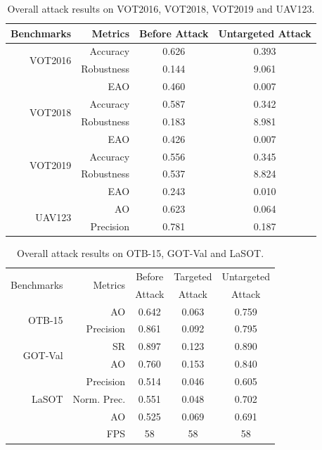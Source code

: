\documentclass[journal]{IEEEtran}
\begin{document}
\begin{table}[h]
  \centering
  \caption{Overall attack results on VOT2016, VOT2018, VOT2019 and UAV123.}
  \begin{tabular}{rrcc}
  \toprule
  Benchmarks & Metrics & Before Attack    & Untargeted Attack  \\
  \midrule
  \multirow{2}{*}[-6pt]{VOT2016} 
  & Accuracy   & 0.626 & 0.393\\
  & Robustness & 0.144 & 9.061\\
  & EAO        & 0.460 & 0.007\\
  \midrule
  \multirow{2}{*}[-6pt]{VOT2018} 
  & Accuracy   & 0.587 & 0.342\\
  & Robustness & 0.183 & 8.981\\
  & EAO        & 0.426 & 0.007\\
  \midrule
  \multirow{2}{*}[-6pt]{VOT2019} 
  & Accuracy   & 0.556 & 0.345\\
  & Robustness & 0.537 & 8.824\\
  & EAO        & 0.243 & 0.010\\
  \midrule
  \multirow{3}{*}[+6pt]{UAV123} 
  & AO  & 0.623 & 0.064\\
  & Precision & 0.781 & 0.187\\
  \bottomrule
  \end{tabular}
  \label{tab:benchmark results1}
\end{table}

\begin{table}[t]
  \centering
  \caption{Overall attack results on OTB-15, GOT-Val and LaSOT.}
  \begin{tabular}{rrccc}
  \toprule
  \multirow{2}{*}{Benchmarks} & \multirow{2}{*}{Metrics} & Before    & Targeted & Untargeted  \\
                            &                         & Attack & Attack & Attack     \\ 
  \midrule
  \multirow{2}{*}{OTB-15} 
  & AO   & 0.642 & 0.063 & 0.759\\
  & Precision & 0.861 & 0.092 & 0.795\\
  \midrule
  \multirow{2}{*}{GOT-Val} 
  & SR & 0.897 & 0.123 & 0.890\\
  & AO & 0.760 & 0.153 & 0.840 \\
  \midrule
  \multirow{3}{*}{LaSOT} 
  & Precision  & 0.514 & 0.046 & 0.605\\
  & Norm. Prec.& 0.551 & 0.048 & 0.702\\
  & AO         & 0.525 & 0.069 & 0.691\\
  \midrule
  \multicolumn{2}{r}{FPS} & 58 & 58 & 58\\
  \bottomrule
  \end{tabular}
  \label{tab:benchmark results}
\end{table}
\end{document}
